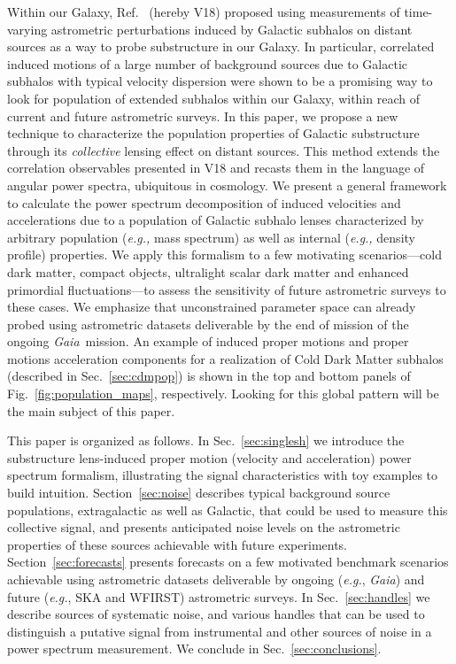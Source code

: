\documentclass[prd,aps,10pt,nofootinbib,twocolumn,superscriptaddress,preprintnumbers,balancelastpage,longbibliography]{revtex4-1}
\newcommand{\Gaia}{\emph{Gaia}\xspace}
\begin{document}
Within our Galaxy, Ref.~\cite{VanTilburg:2018ykj} (hereby V18) proposed using measurements of time-varying astrometric perturbations induced by Galactic subhalos on distant sources as a way to probe substructure in our Galaxy. In particular, correlated induced motions of a large number of background sources due to Galactic subhalos with typical velocity dispersion were shown to be a promising way to look for population of extended subhalos within our Galaxy, within reach of current and future astrometric surveys. In this paper, we propose a new technique to characterize the population properties of Galactic substructure through its \emph{collective} lensing effect on distant sources. This method extends the correlation observables presented in V18 and recasts them in the language of angular power spectra, ubiquitous in cosmology. We present a general framework to calculate the power spectrum decomposition of induced velocities and accelerations due to a population of Galactic subhalo lenses characterized by arbitrary population (\emph{e.g.,} mass spectrum) as well as internal (\emph{e.g.,} density profile) properties. We apply this formalism to a few motivating scenarios---cold dark matter, compact objects, ultralight scalar dark matter and enhanced primordial fluctuations---to assess the sensitivity of future astrometric surveys to these cases. We emphasize that unconstrained parameter space can already probed using astrometric datasets deliverable by the end of mission of the ongoing \Gaia~mission. An example of induced proper motions and proper motions acceleration components for a realization of Cold Dark Matter subhalos (described in Sec.~\ref{sec:cdmpop}) is shown in the top and bottom panels of Fig.~\ref{fig:population_maps}, respectively. Looking for this global pattern will be the main subject of this paper.  

This paper is organized as follows. In Sec.~\ref{sec:singlesh} we introduce the substructure lens-induced proper motion (velocity and acceleration) power spectrum formalism, illustrating the signal characteristics with toy examples to build intuition. Section~\ref{sec:noise} describes typical background source populations, extragalactic as well as Galactic, that could be used to measure this collective signal, and presents anticipated noise levels on the astrometric properties of these sources achievable with future experiments.  Section~\ref{sec:forecasts} presents forecasts on a few motivated benchmark scenarios achievable using astrometric datasets deliverable by ongoing (\emph{e.g.}, \Gaia) and future (\emph{e.g.}, SKA and WFIRST) astrometric surveys. In Sec.~\ref{sec:handles} we describe sources of systematic noise, and various handles that can be used to distinguish a putative signal from instrumental and other sources of noise in a power spectrum measurement. 
We conclude in Sec.~\ref{sec:conclusions}.
\end{document}
